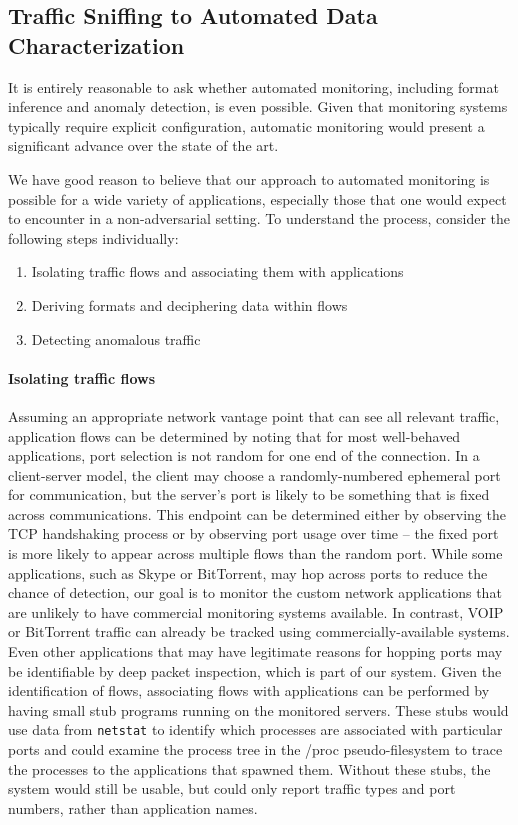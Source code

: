 \subsection{Traffic Sniffing to Automated Data Characterization}
\label{sec:sniffer}

It is entirely reasonable to ask whether automated monitoring,
including format inference and anomaly detection, is even
possible. Given that monitoring systems typically require explicit
configuration, automatic monitoring would present a significant
advance over the state of the art.

We have good reason to believe that our approach to automated
monitoring is possible for a wide variety of applications, especially
those that one would expect to encounter in a non-adversarial setting.
To understand the process, consider the following steps individually:

\begin{enumerate}
\item Isolating traffic flows and associating them with applications
\vspace{-.05in}
\item Deriving formats and deciphering data within flows
\vspace{-.05in}
\item Detecting anomalous traffic
\end{enumerate}

\paragraph*{Isolating traffic flows} Assuming an appropriate network
vantage point that can see all relevant traffic, application flows can
be determined by noting that for most well-behaved applications, port
selection is not random for one end of the connection. In a
client-server model, the client may choose a randomly-numbered
ephemeral port for communication, but the server's port is likely to
be something that is fixed across communications. This endpoint can be
determined either by observing the TCP handshaking process or by
observing port usage over time -- the fixed port is more likely to
appear across multiple flows than the random port. While some
applications, such as Skype or BitTorrent, may hop across ports to
reduce the chance of detection, our goal is to monitor the custom
network applications that are unlikely to have commercial monitoring
systems available. In contrast, VOIP or BitTorrent traffic can already
be tracked using commercially-available systems. Even other
applications that may have legitimate reasons for hopping ports may be
identifiable by deep packet inspection, which is part of our
system. Given the identification of flows, associating flows with
applications can be performed by having small stub programs running on
the monitored servers. These stubs would use data from \texttt{netstat}
to identify which processes are associated with particular ports and
could examine the process tree in the /proc pseudo-filesystem to trace
the processes to the applications that spawned them. Without these
stubs, the system would still be usable, but could only report traffic
types and port numbers, rather than application names.

